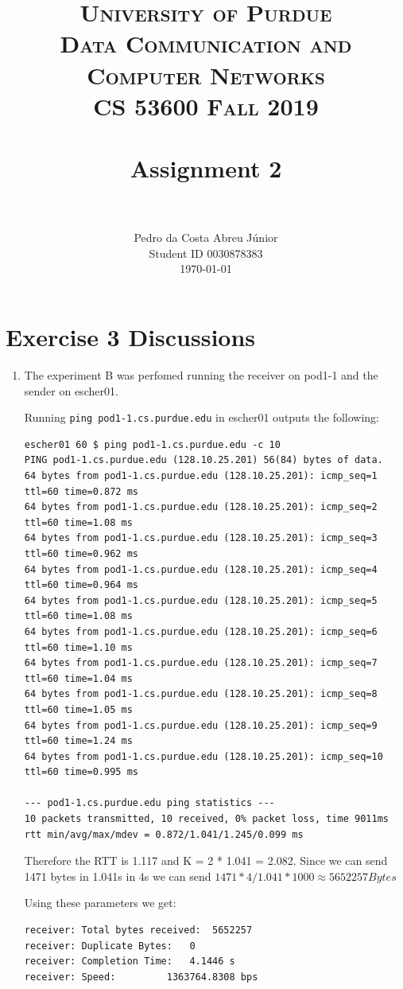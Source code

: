\documentclass[paper=a4, fontsize=11pt]{scrartcl}
\title{
		\usefont{OT1}{bch}{b}{n}
		\normalfont \normalsize \textsc{University of Purdue\\
      Data Communication and Computer Networks\\
      CS 53600 Fall 2019} \\ [25pt]
		\horrule{0.5pt} \\[0.4cm]
		\huge Assignment 2\\
		\horrule{2pt} \\[0.5cm]
}
\author{
		\normalfont\normalsize Pedro da Costa Abreu Júnior\\ [-5pt]
    \normalsize Student ID 0030878383\\[-5pt]
    \normalsize \today
}
\date{}
\numberwithin{equation}{section}		%
\numberwithin{figure}{section}			%
\numberwithin{table}{section}				%
\begin{document}
\maketitle

\section*{Exercise 3 Discussions}

\begin{enumerate}
\item The experiment B was perfomed running the receiver on pod1-1 and the sender on escher01.

  Running \verb|ping pod1-1.cs.purdue.edu| in escher01 outputs the following:

\begin{verbatim}
escher01 60 $ ping pod1-1.cs.purdue.edu -c 10
PING pod1-1.cs.purdue.edu (128.10.25.201) 56(84) bytes of data.
64 bytes from pod1-1.cs.purdue.edu (128.10.25.201): icmp_seq=1 ttl=60 time=0.872 ms
64 bytes from pod1-1.cs.purdue.edu (128.10.25.201): icmp_seq=2 ttl=60 time=1.08 ms
64 bytes from pod1-1.cs.purdue.edu (128.10.25.201): icmp_seq=3 ttl=60 time=0.962 ms
64 bytes from pod1-1.cs.purdue.edu (128.10.25.201): icmp_seq=4 ttl=60 time=0.964 ms
64 bytes from pod1-1.cs.purdue.edu (128.10.25.201): icmp_seq=5 ttl=60 time=1.08 ms
64 bytes from pod1-1.cs.purdue.edu (128.10.25.201): icmp_seq=6 ttl=60 time=1.10 ms
64 bytes from pod1-1.cs.purdue.edu (128.10.25.201): icmp_seq=7 ttl=60 time=1.04 ms
64 bytes from pod1-1.cs.purdue.edu (128.10.25.201): icmp_seq=8 ttl=60 time=1.05 ms
64 bytes from pod1-1.cs.purdue.edu (128.10.25.201): icmp_seq=9 ttl=60 time=1.24 ms
64 bytes from pod1-1.cs.purdue.edu (128.10.25.201): icmp_seq=10 ttl=60 time=0.995 ms

--- pod1-1.cs.purdue.edu ping statistics ---
10 packets transmitted, 10 received, 0% packet loss, time 9011ms
rtt min/avg/max/mdev = 0.872/1.041/1.245/0.099 ms
\end{verbatim}

Therefore the RTT is 1.117 and K = 2 * 1.041 = 2.082.
Since we can send 1471 bytes in 1.041s in 4s we can send
$1471 * 4 / 1.041 * 1000 \approx 5652257 Bytes$

Using these parameters we get:

\begin{verbatim}
receiver: Total bytes received:	 5652257
receiver: Duplicate Bytes:	 0
receiver: Completion Time:	 4.1446 s
receiver: Speed:		 1363764.8308 bps
\end{verbatim}


\end{enumerate}
\end{document}
